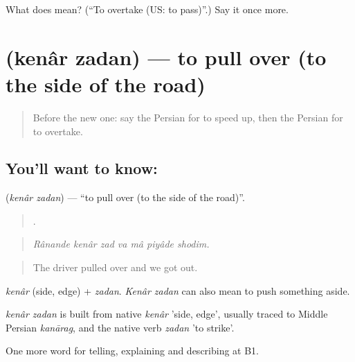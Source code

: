 \begin{tcolorbox}[breakable,colback=teal!4,colframe=teal!35!black,title={Before you move on}]
What does   mean? (\textquotedblleft{}To overtake (US: to pass)\textquotedblright{}.) Say it once more.
\end{tcolorbox}
\section[\texorpdfstring{\fa{کنار} \fa{زدن} (kenâr zadan)}{کنار زدن (kenâr zadan)}]{  (kenâr zadan) — to pull over (to the side of the road)}

\label{lesson:FA-C424-kenar-zadan}



\begin{quote}
Before the new one: say the Persian for to speed up, then the Persian for to overtake.
\end{quote}

\subsection*{You'll want to know:  }
\textbf{ } (\emph{kenâr zadan}) — \textquotedblleft{}to pull over (to the side of the road)\textquotedblright{}.

\begin{quote}
      .
\end{quote}

\begin{quote}
\emph{Rânande kenâr zad va mâ piyâde shodim.}
\end{quote}

\begin{quote}
The driver pulled over and we got out.
\end{quote}

\emph{kenâr} (side, edge) + \emph{zadan}. \emph{Kenâr zadan} can also mean to push something aside.

\begin{cousinweb}
\emph{kenâr zadan} is built from native \emph{kenâr} 'side, edge', usually traced to Middle Persian \emph{kanārag}, and the native verb \emph{zadan} 'to strike'.
\end{cousinweb}

\begin{grammarlens}[title={What you've built}]
One more word for telling, explaining and describing at B1.
\end{grammarlens}

